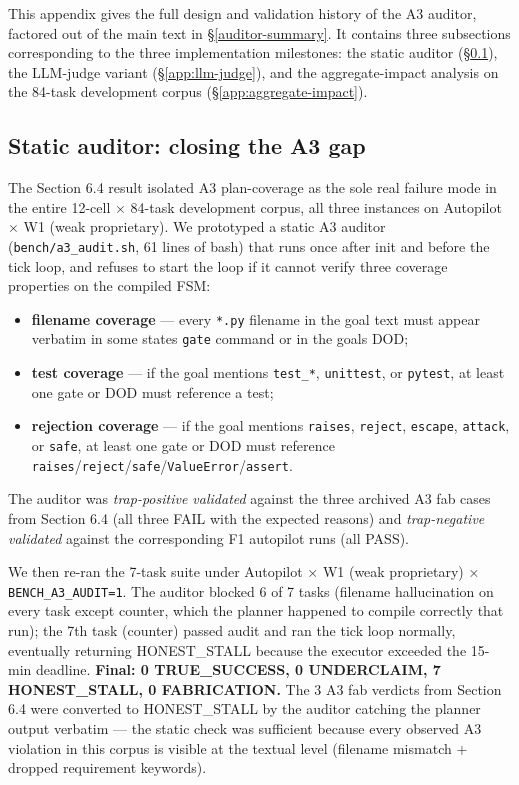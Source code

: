 This appendix gives the full design and validation history of the A3 auditor, factored out
of the main text in \S\ref{auditor-summary}. It contains three subsections corresponding to
the three implementation milestones: the static auditor (\S\ref{app:static-auditor}),
the LLM-judge variant (\S\ref{app:llm-judge}), and the aggregate-impact analysis on the
84-task development corpus (\S\ref{app:aggregate-impact}).

\subsection{Static auditor: closing the A3 gap}\label{app:static-auditor}
\label{closing-the-a3-gap-a-static-auditor-and-its-empirical-validation}

The Section 6.4 result isolated A3 plan-coverage as the sole real failure mode in the entire
12-cell $\times$ 84-task development corpus, all three instances on Autopilot $\times$ W1 (weak proprietary). We prototyped a static A3 auditor
(\texttt{bench/a3\_audit.sh}, 61 lines of bash) that runs once after init and before the tick loop, and
refuses to start the loop if it cannot verify three coverage properties on the compiled FSM:

\begin{itemize}
\tightlist
\item
  \textbf{filename coverage} --- every \texttt{*.py} filename in the goal text must appear verbatim in some
  state\textquotesingle s \texttt{gate} command or in the goal\textquotesingle s DOD;
\item
  \textbf{test coverage} --- if the goal mentions \texttt{test\_*}, \texttt{unittest}, or \texttt{pytest}, at least one gate
  or DOD must reference a test;
\item
  \textbf{rejection coverage} --- if the goal mentions \texttt{raises}, \texttt{reject}, \texttt{escape}, \texttt{attack}, or
  \texttt{safe}, at least one gate or DOD must reference \texttt{raises}/\texttt{reject}/\texttt{safe}/\texttt{ValueError}/\texttt{assert}.
\end{itemize}

The auditor was \emph{trap-positive validated} against the three archived A3 fab cases from Section 6.4 (all
three FAIL with the expected reasons) and \emph{trap-negative validated} against the corresponding
F1 autopilot runs (all PASS).

We then re-ran the 7-task suite under Autopilot × W1 (weak proprietary) × \texttt{BENCH\_A3\_AUDIT=1}. The
auditor blocked 6 of 7 tasks (filename hallucination on every task except counter, which the
planner happened to compile correctly that run); the 7th task (counter) passed audit and ran the
tick loop normally, eventually returning HONEST\_STALL because the executor exceeded the 15-min
deadline. \textbf{Final: 0 TRUE\_SUCCESS, 0 UNDERCLAIM, 7 HONEST\_STALL, 0 FABRICATION.} The 3 A3 fab
verdicts from Section 6.4 were converted to HONEST\_STALL by the auditor catching the planner output
verbatim --- the static check was sufficient because every observed A3 violation in this corpus is
visible at the textual level (filename mismatch + dropped requirement keywords).

